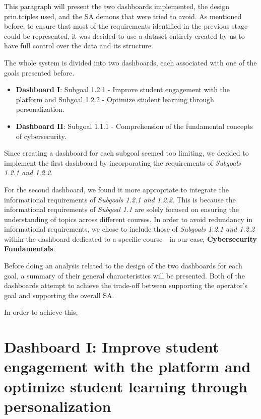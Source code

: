 This paragraph will present the two dashboards implemented, the design prin.tciples used, and the SA demons that were tried to avoid. As mentioned before, to ensure that most of the requirements identified in the previous stage could be represented, it was decided to use a dataset entirely created by us to have full control over the data and its structure.

The whole system is divided into two dashboards, each associated with one of the goals presented before.

\begin{itemize}
    \item \textbf{Dashboard I}: Subgoal 1.2.1 - Improve student engagement with the platform and Subgoal 1.2.2 - Optimize student learning through personalization.
    \item \textbf{Dashboard II}: Subgoal 1.1.1 - Comprehension of the fundamental concepts of cybersecurity.
\end{itemize}

Since creating a dashboard for each subgoal seemed too limiting, we decided to implement the first dashboard by incorporating the requirements of \textit{Subgoals 1.2.1 and 1.2.2}. 

For the second dashboard, we found it more appropriate to integrate the informational requirements of \textit{Subgoals 1.2.1 and 1.2.2}. This is because the informational requirements of \textit{Subgoal 1.1} are solely focused on ensuring the understanding of topics across different courses. In order to avoid redundancy in informational requirements, we chose to include those of \textit{Subgoals 1.2.1 and 1.2.2} within the dashboard dedicated to a specific course—in our case, \textbf{Cybersecurity Fundamentals}. 

Before doing an analysis related to the design of the two dashboards for each goal, a summary of their general characteristics will be presented. 
Both of the dashboards attempt to achieve the trade-off between supporting the operator's goal and supporting the overall SA. 

In order to achieve this, 






\section{Dashboard I: Improve student engagement with the platform and optimize student learning through personalization}

